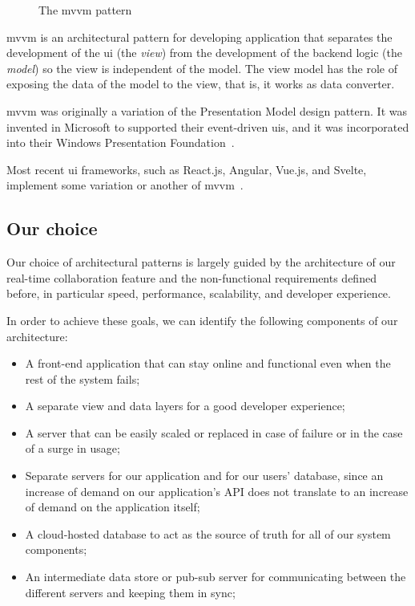\begin{toexclude}
\begin{figure}[H]

	\caption{The \acrshort{mvvm} pattern}
	\label{fig:mvvm-arch}
\end{figure}

\acrfull{mvvm} is an architectural pattern for developing application that separates the development of the \acrfull{ui} (the \emph{view}) from the development of the backend logic (the \emph{model}) so the view is independent of the model.
The view model has the role of exposing the data of the model to the view, that is, it works as data converter.

\acrshort{mvvm} was originally a variation of the Presentation Model design pattern. It was invented in Microsoft to supported their event-driven \acrshort{ui}s, and it was incorporated into their Windows Presentation Foundation~\autocite{smith_patterns_2009}.

Most recent \acrshort{ui} frameworks, such as React.js, Angular, Vue.js, and Svelte, implement some variation or another of \acrshort{mvvm}~\autocite{noauthor_javascript_nodate}.

\subsection{Our choice}

Our choice of architectural patterns is largely guided by the architecture of our real-time collaboration feature and the non-functional requirements defined before, in particular speed, performance, scalability, and developer experience.

In order to achieve these goals, we can identify the following components of our architecture:

\begin{itemize}
	\item A front-end application that can stay online and functional even when the rest of the system fails;
	\item A separate view and data layers for a good developer experience;
	\item A server that can be easily scaled or replaced in case of failure or in the case of a surge in usage;
	\item Separate servers for our application and for our users' database, since an increase of demand on our application's API does not translate to an increase of demand on the application itself;
	\item A cloud-hosted database to act as the source of truth for all of our system components;
	\item An intermediate data store or pub-sub server for communicating between the different servers and keeping them in sync;
\end{itemize}


\end{toexclude}
